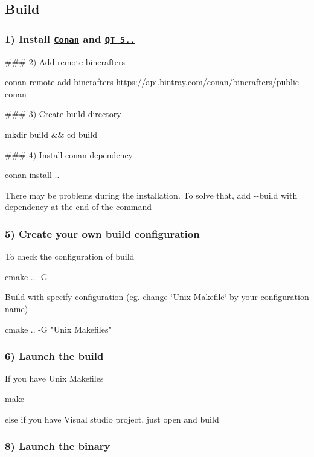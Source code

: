 \subsection*{Build}

\subsubsection*{1) Install \href{https://conan.io}{\tt Conan} and \href{https://wiki.qt.io/Special:Search/Install_Qt_5}{\tt QT 5..}}

\#\#\# 2) Add remote bincrafters 
\begin{DoxyCode}
conan remote add bincrafters https://api.bintray.com/conan/bincrafters/public-conan
\end{DoxyCode}


\#\#\# 3) Create build directory 
\begin{DoxyCode}
mkdir build && cd build
\end{DoxyCode}


\#\#\# 4) Install conan dependency 
\begin{DoxyCode}
conan install ..
\end{DoxyCode}


There may be problems during the installation. To solve that, add {\ttfamily -\/-\/build} with dependency at the end of the command

\subsubsection*{5) Create your own build configuration}

To check the configuration of build 
\begin{DoxyCode}
cmake .. -G
\end{DoxyCode}
 Build with specify configuration (eg. change \char`\"{}\+Unix Makefile\char`\"{} by your configuration name) 
\begin{DoxyCode}
cmake .. -G "Unix Makefiles"
\end{DoxyCode}


\subsubsection*{6) Launch the build}

If you have Unix Makefiles 
\begin{DoxyCode}
make
\end{DoxyCode}
 else if you have Visual studio project, just open and build

\subsubsection*{8) Launch the binary}